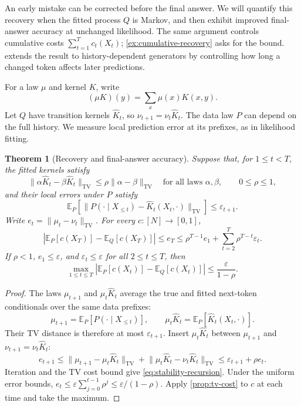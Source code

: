 \documentclass[11pt,twoside]{article}
\newcommand{\E}{\mathbb E}
\newcommand{\tv}[1]{\lVert #1\rVert_{\mathrm{TV}}}
\newtheorem{theorem}{Theorem}[section]
\theoremstyle{definition}
\theoremstyle{remark}
\begin{document}
An early mistake can be corrected before the final answer. We will
quantify this recovery when the fitted process \(Q\) is Markov,
and then exhibit improved final-answer accuracy at unchanged likelihood.
The same argument controls cumulative costs
\(\sum_{t=1}^T c_t(X_t)\); \cref{ex:cumulative-recovery} asks for the bound.
 extends the result to history-dependent
generators by controlling how long a changed token affects later predictions.

For a law \(\mu\) and kernel \(K\), write
\[
 (\mu K)(y)=\sum_x\mu(x)K(x,y).
\]
Let \(Q\) have transition kernels \(\widehat K_t\), so
\(\nu_{t+1}=\nu_t\widehat K_t\). The data law \(P\) can depend on
the full history. We measure local prediction error at its prefixes,
as in likelihood fitting.

\begin{theorem}[Recovery and final-answer accuracy]
\label{thm:markov-stability}
Suppose that, for \(1\le t<T\), the fitted kernels satisfy
\begin{equation}
 \tv{\alpha\widehat K_t-\beta\widehat K_t}
 \le\rho\tv{\alpha-\beta}
 \quad\text{for all laws }\alpha,\beta,\qquad 0\le\rho\le1,
 \label{eq:markov-contraction}
\end{equation}
and their local errors under \(P\) satisfy
\begin{equation}
 \E_P\!\left[
 \tv{P(\cdot\mid X_{\le t})-\widehat K_t(X_t,\cdot)}
 \right]
 \le\varepsilon_{t+1}.
 \label{eq:markov-local-error}
\end{equation}
Write \(e_t=\tv{\mu_t-\nu_t}\). For every \(c:[N]\to[0,1]\),
\begin{equation}
 \left|\E_P[c(X_T)]-\E_Q[c(X_T)]\right|
 \le e_T
 \le\rho^{T-1}e_1+\sum_{t=2}^T\rho^{T-t}\varepsilon_t.
 \label{eq:stability-recursion}
\end{equation}
If \(\rho<1\), \(e_1\le\varepsilon\), and
\(\varepsilon_t\le\varepsilon\) for all \(2\le t\le T\), then
\begin{equation}
 \max_{1\le t\le T}
 \left|\E_P[c(X_t)]-\E_Q[c(X_t)]\right|
 \le\frac{\varepsilon}{1-\rho}.
 \label{eq:frequency-control}
\end{equation}
\end{theorem}

\begin{proof}
The laws \(\mu_{t+1}\) and \(\mu_t\widehat K_t\) average the true
and fitted next-token conditionals over the same data prefixes:
\[
 \mu_{t+1}=\E_P[P(\cdot\mid X_{\le t})],\qquad
 \mu_t\widehat K_t=\E_P[\widehat K_t(X_t,\cdot)].
\]
Their TV distance is therefore at most \(\varepsilon_{t+1}\).
Insert \(\mu_t\widehat K_t\) between \(\mu_{t+1}\) and
\(\nu_{t+1}=\nu_t\widehat K_t\):
\[
 e_{t+1}
 \le \tv{\mu_{t+1}-\mu_t\widehat K_t}
      +\tv{\mu_t\widehat K_t-\nu_t\widehat K_t}
 \le\varepsilon_{t+1}+\rho e_t.
\]
Iteration and the TV cost bound give \cref{eq:stability-recursion}.
Under the uniform
error bounds, \(e_t\le\varepsilon\sum_{j=0}^{t-1}\rho^j
\le\varepsilon/(1-\rho)\). Apply \cref{prop:tv-cost} to \(c\) at
each time and take the maximum.
\end{proof}
\end{document}
